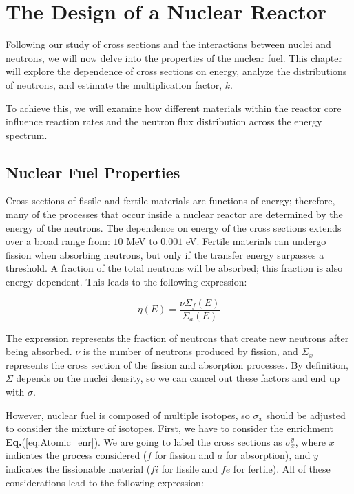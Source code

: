 \chapter{The Design of a Nuclear Reactor}
Following our study of cross sections and the interactions between nuclei and neutrons, we will now delve into the properties of the nuclear fuel. This chapter will explore the dependence of cross sections on energy, analyze the distributions of neutrons, and estimate the multiplication factor, \( k \).

To achieve this, we will examine how different materials within the reactor core influence reaction rates and the neutron flux distribution across the energy spectrum.


\section{Nuclear Fuel Properties}

Cross sections of fissile and fertile materials are functions of energy; therefore, many of the processes that occur inside a nuclear reactor are determined by the energy of the neutrons. The dependence on energy of the cross sections extends over a broad range from: \(10\) MeV to \(0.001\) eV. Fertile materials can undergo fission when absorbing neutrons, but only if the transfer energy surpasses a threshold. A fraction of the total neutrons will be absorbed; this fraction is also energy-dependent. This leads to the following expression:

\begin{equation}
    \eta (E) = \frac{\nu \Sigma_{f}(E)}{\Sigma_{a}(E)}
    \label{eq:first_eta_def}
\end{equation}

The expression represents the fraction of neutrons that create new neutrons after being absorbed. $\nu$ is the number of neutrons produced by fission, and $\Sigma_{x}$ represents the cross section of the fission and absorption processes. By definition, $\Sigma$ depends on the nuclei density, so we can cancel out these factors and end up with $\sigma$.

However, nuclear fuel is composed of multiple isotopes, so $\sigma_{x}$ should be adjusted to consider the mixture of isotopes. First, we have to consider the enrichment \textbf{Eq.}(\ref{eq:Atomic_enr}). We are going to label the cross sections as $\sigma_{x}^{y}$, where \(x\) indicates the process considered (\(f\) for fission and \(a\) for absorption), and \(y\) indicates the fissionable material (\(fi\) for fissile and \(fe\) for fertile). All of these considerations lead to the following expression:

